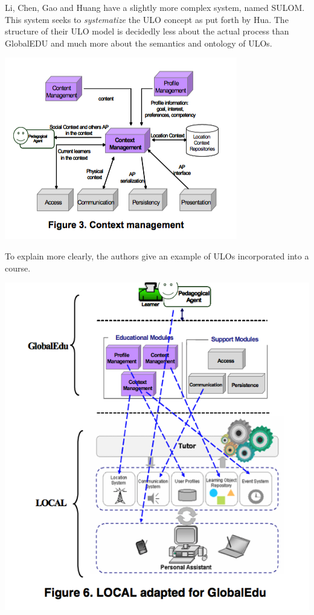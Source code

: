 \documentclass[twoside]{article}
\begin{document}
\begin{multicols}{2}
\setlength\parindent{24pt}Li, Chen, Gao and Huang have a slightly more complex system, named SULOM. This system seeks to \emph{systematize} the ULO concept as put forth by Hua. The structure of their ULO model is decidedly less about the actual process than GlobalEDU and much more about the semantics and ontology of ULOs.
\begin{flushright}
\includegraphics[scale=0.55,right]{4} 
\end{flushright} 
To explain more clearly, the authors give an example of ULOs incorporated into a course. 
\begin{flushright}
\includegraphics[scale=0.35,right]{5} 

\end{flushright}
\end{multicols}
\end{document}
